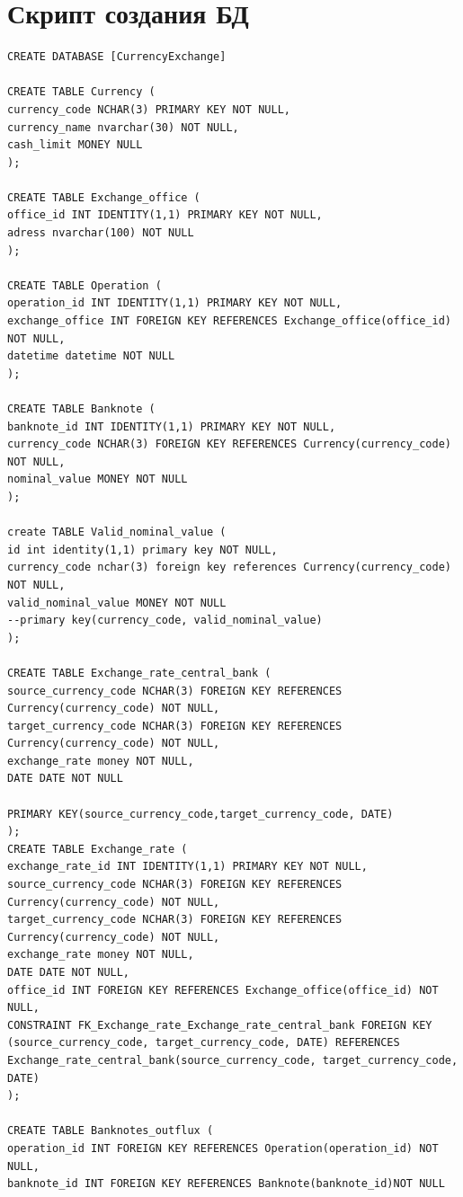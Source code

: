 \documentclass{article}
\begin{document}
\section{Скрипт создания БД}
\begin{verbatim}
CREATE DATABASE [CurrencyExchange]
 
CREATE TABLE Currency (
currency_code NCHAR(3) PRIMARY KEY NOT NULL,
currency_name nvarchar(30) NOT NULL,
cash_limit MONEY NULL
);
 
CREATE TABLE Exchange_office (
office_id INT IDENTITY(1,1) PRIMARY KEY NOT NULL,
adress nvarchar(100) NOT NULL
);
 
CREATE TABLE Operation (
operation_id INT IDENTITY(1,1) PRIMARY KEY NOT NULL,
exchange_office INT FOREIGN KEY REFERENCES Exchange_office(office_id) NOT NULL,
datetime datetime NOT NULL
);
 
CREATE TABLE Banknote (
banknote_id INT IDENTITY(1,1) PRIMARY KEY NOT NULL,
currency_code NCHAR(3) FOREIGN KEY REFERENCES Currency(currency_code) NOT NULL,
nominal_value MONEY NOT NULL
);

create TABLE Valid_nominal_value (
id int identity(1,1) primary key NOT NULL,
currency_code nchar(3) foreign key references Currency(currency_code) NOT NULL,
valid_nominal_value MONEY NOT NULL
--primary key(currency_code, valid_nominal_value)
);
 
CREATE TABLE Exchange_rate_central_bank (
source_currency_code NCHAR(3) FOREIGN KEY REFERENCES Currency(currency_code) NOT NULL,
target_currency_code NCHAR(3) FOREIGN KEY REFERENCES Currency(currency_code) NOT NULL,
exchange_rate money NOT NULL,
DATE DATE NOT NULL
 
PRIMARY KEY(source_currency_code,target_currency_code, DATE)
);
CREATE TABLE Exchange_rate (
exchange_rate_id INT IDENTITY(1,1) PRIMARY KEY NOT NULL,
source_currency_code NCHAR(3) FOREIGN KEY REFERENCES Currency(currency_code) NOT NULL,
target_currency_code NCHAR(3) FOREIGN KEY REFERENCES Currency(currency_code) NOT NULL,
exchange_rate money NOT NULL,
DATE DATE NOT NULL,
office_id INT FOREIGN KEY REFERENCES Exchange_office(office_id) NOT NULL,
CONSTRAINT FK_Exchange_rate_Exchange_rate_central_bank FOREIGN KEY (source_currency_code, target_currency_code, DATE) REFERENCES Exchange_rate_central_bank(source_currency_code, target_currency_code, DATE)
);
 
CREATE TABLE Banknotes_outflux (
operation_id INT FOREIGN KEY REFERENCES Operation(operation_id) NOT NULL,
banknote_id INT FOREIGN KEY REFERENCES Banknote(banknote_id)NOT NULL
 

\end{verbatim}
\end{document}
